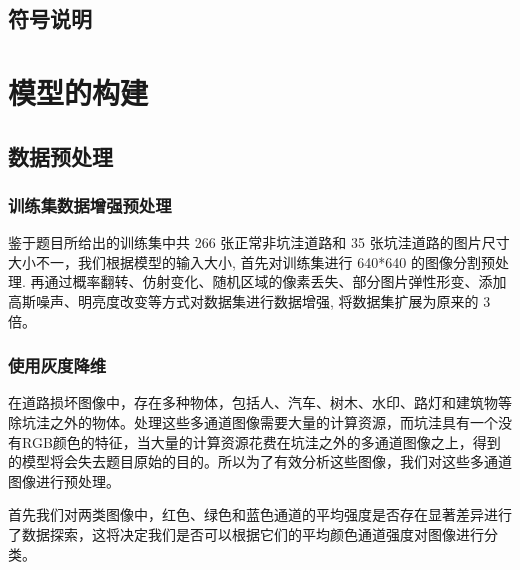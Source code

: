 \documentclass[a4paper, 10pt]{article}
\begin{document}
	\subsection{符号说明}
	
	\section{模型的构建}
	
	\subsection{数据预处理}
	
	\subsubsection{训练集数据增强预处理}
	
	鉴于题目所给出的训练集中共 266 张正常非坑洼道路和 35 张坑洼道路的图片尺寸大小不一，我们根据模型的输入大小, 首先对训练集进行 640*640 的图像分割预处理. 再通过概率翻转、仿射变化、随机区域的像素丢失、部分图片弹性形变、添加高斯噪声、明亮度改变等方式对数据集进行数据增强, 将数据集扩展为原来的 3 倍。
	
	\subsubsection{使用灰度降维}
	
	在道路损坏图像中，存在多种物体，包括人、汽车、树木、水印、路灯和建筑物等除坑洼之外的物体。处理这些多通道图像需要大量的计算资源，而坑洼具有一个没有RGB颜色的特征，当大量的计算资源花费在坑洼之外的多通道图像之上，得到的模型将会失去题目原始的目的。所以为了有效分析这些图像，我们对这些多通道图像进行预处理。
	
	首先我们对两类图像中，红色、绿色和蓝色通道的平均强度是否存在显著差异进行了数据探索，这将决定我们是否可以根据它们的平均颜色通道强度对图像进行分类。
	
\end{document}
